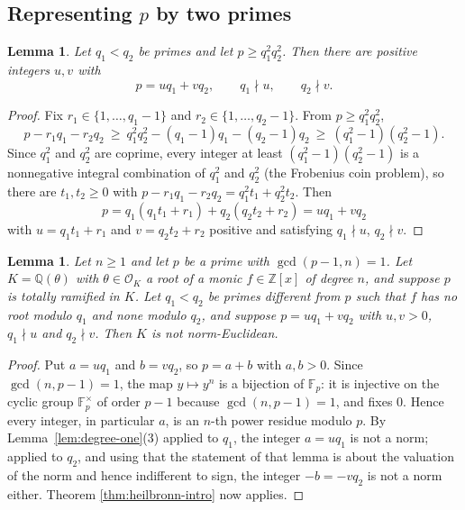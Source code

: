 \documentclass[11pt,reqno]{amsart}
\theoremstyle{plain}
\newtheorem{lemma}[theorem]{Lemma}
\theoremstyle{definition}
\theoremstyle{remark}
\newcommand{\Z}{\mathbb{Z}}
\newcommand{\Q}{\mathbb{Q}}
\newcommand{\F}{\mathbb{F}}
\newcommand{\OK}{\mathcal{O}_K}
\begin{document}
\subsection{Representing $p$ by two primes}

\begin{lemma}\label{lem:frobenius}
Let $q_1<q_2$ be primes and let $p\ge q_1^2q_2^2$. Then there are positive integers $u,v$ with
\[
  p=uq_1+vq_2,\qquad q_1\nmid u,\qquad q_2\nmid v .
\]
\end{lemma}

\begin{proof}
Fix $r_1\in\{1,\dots,q_1-1\}$ and $r_2\in\{1,\dots,q_2-1\}$. From $p\ge q_1^2q_2^2$,
\[
  p-r_1q_1-r_2q_2\ \ge\ q_1^2q_2^2-(q_1-1)q_1-(q_2-1)q_2\ \ge\ (q_1^2-1)(q_2^2-1).
\]
Since $q_1^2$ and $q_2^2$ are coprime, every integer at least $(q_1^2-1)(q_2^2-1)$ is a
nonnegative integral combination of $q_1^2$ and $q_2^2$ (the Frobenius coin problem), so there are
$t_1,t_2\ge0$ with $p-r_1q_1-r_2q_2=q_1^2t_1+q_2^2t_2$. Then
\[
  p=q_1(q_1t_1+r_1)+q_2(q_2t_2+r_2)=uq_1+vq_2
\]
with $u=q_1t_1+r_1$ and $v=q_2t_2+r_2$ positive and satisfying $q_1\nmid u$, $q_2\nmid v$.
\end{proof}

\begin{lemma}\label{lem:heilbronn-applies}
Let $n\ge1$ and let $p$ be a prime with $\gcd(p-1,n)=1$. Let $K=\Q(\theta)$ with $\theta\in\OK$ a
root of a monic $f\in\Z[x]$ of degree $n$, and suppose $p$ is totally ramified in $K$. Let
$q_1<q_2$ be primes different from $p$ such that $f$ has no root modulo $q_1$ and none modulo
$q_2$, and suppose $p=uq_1+vq_2$ with $u,v>0$, $q_1\nmid u$ and $q_2\nmid v$. Then $K$ is not
norm-Euclidean.
\end{lemma}

\begin{proof}
Put $a=uq_1$ and $b=vq_2$, so $p=a+b$ with $a,b>0$. Since $\gcd(n,p-1)=1$, the map $y\mapsto y^n$
is a bijection of $\F_p$: it is injective on the cyclic group $\F_p^\times$ of order $p-1$ because
$\gcd(n,p-1)=1$, and fixes $0$. Hence every integer, in particular $a$, is an $n$-th power residue
modulo $p$. By Lemma~\ref{lem:degree-one}(3) applied to $q_1$, the integer $a=uq_1$ is not a norm;
applied to $q_2$, and using that the statement of that lemma is about the valuation of the norm
and hence indifferent to sign, the integer $-b=-vq_2$ is not a norm either. Theorem
\ref{thm:heilbronn-intro} now applies.
\end{proof}
\end{document}
